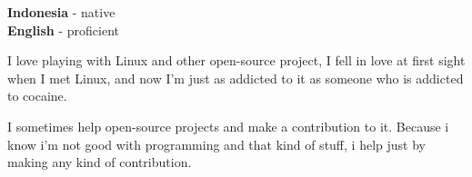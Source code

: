 \documentclass[9pt]{developercv} %
\begin{document}
\begin{minipage}[t]{0.3\textwidth}
	\vspace{-\baselineskip} %

	
	\textbf{Indonesia} - native\\
	\textbf{English} - proficient\\
\end{minipage}
\hfill
\begin{minipage}[t]{0.3\textwidth}
	\vspace{-\baselineskip} %
	
	
	I love playing with Linux and other open-source project, I fell in love at
  first sight when I met Linux, and now I'm just as addicted to it as someone who
  is addicted to cocaine.
\end{minipage}
\hfill
\begin{minipage}[t]{0.3\textwidth}
	\vspace{-\baselineskip} %
	
	
	I sometimes help open-source projects and make a contribution to it. Because
  i know i'm not good with programming and that kind of stuff, i help just by
  making any kind of contribution.
\end{minipage}

\end{document}
